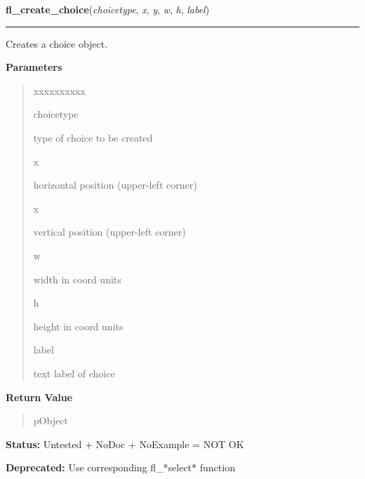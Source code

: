 \hspace{.8\funcindent}\begin{boxedminipage}{\funcwidth}

    \raggedright \textbf{fl\_create\_choice}(\textit{choicetype}, \textit{x}, \textit{y}, \textit{w}, \textit{h}, \textit{label})

    \vspace{-1.5ex}

    \rule{\textwidth}{0.5\fboxrule}
\setlength{\parskip}{2ex}
    Creates a choice object.

\setlength{\parskip}{1ex}
      \textbf{Parameters}
      \vspace{-1ex}

      \begin{quote}
        \begin{Ventry}{xxxxxxxxxx}

          \item[choicetype]

          type of choice to be created

          \item[x]

          horizontal position (upper-left corner)

          \item[x]

          vertical position (upper-left corner)

          \item[w]

          width in coord units

          \item[h]

          height in coord units

          \item[label]

          text label of choice

        \end{Ventry}

      \end{quote}

      \textbf{Return Value}
    \vspace{-1ex}

      \begin{quote}
      pObject

      \end{quote}

\textbf{Status:} Untested + NoDoc + NoExample = NOT OK



\textbf{Deprecated:} Use corresponding fl\_*select* function



    \end{boxedminipage}


